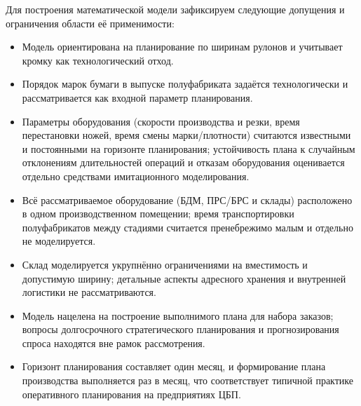 Для построения математической модели зафиксируем следующие допущения и ограничения области её применимости:
\begin{itemize}
    \item Модель ориентирована на планирование по ширинам рулонов и учитывает кромку как технологический отход.
    \item Порядок марок бумаги в выпуске полуфабриката задаётся технологически и рассматривается как входной параметр планирования.
    \item Параметры оборудования (скорости производства и резки, время перестановки ножей, время смены марки/плотности) считаются известными и постоянными на горизонте планирования; устойчивость плана к случайным отклонениям длительностей операций и отказам оборудования оценивается отдельно средствами имитационного моделирования.
    \item Всё рассматриваемое оборудование (БДМ, ПРС/БРС и склады) расположено в одном производственном помещении; время транспортировки полуфабрикатов между стадиями считается пренебрежимо малым и отдельно не моделируется.
    \item Склад моделируется укрупнённо ограничениями на вместимость и допустимую ширину; детальные аспекты адресного хранения и внутренней логистики не рассматриваются.
    \item Модель нацелена на построение выполнимого плана для набора заказов; вопросы долгосрочного стратегического планирования и прогнозирования спроса находятся вне рамок рассмотрения.
    \item Горизонт планирования составляет один месяц, и формирование плана производства выполняется раз в месяц, что соответствует типичной практике оперативного планирования на предприятиях ЦБП.
\end{itemize}

